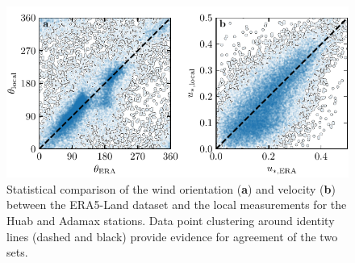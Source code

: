 \begin{figure}[p]
\centering
\includegraphics[scale=1]{Figures/Figure7_supp.pdf}
\caption{Statistical comparison of the wind orientation (\textbf{a}) and velocity (\textbf{b}) between the ERA5-Land dataset and the local measurements for the Huab and Adamax stations. Data point clustering around identity lines (dashed and black) provide evidence for agreement of the two sets.}
\label{Fig7_supp}
\end{figure}

